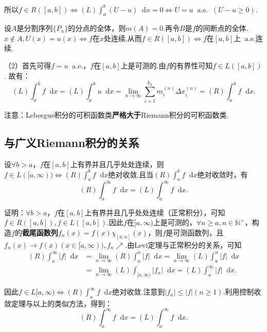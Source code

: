 \documentclass[bwprint, withoutpreface]{cumcmthesis}
\newcommand*{\dif}{\mathop{}\!\mathrm{d}}
\begin{document}
所以$f \in R([a, b]) \Leftrightarrow (L) \int_{a}^{b} (U - u) \dif x = 0 \Leftrightarrow U = u \mathop{} \! \mathrm{a.e.} \! \mathop{} (U - u \geqslant 0)$.

设$A$是分割序列$\{P_n\}$的分点的全体，则$m(A) = 0$.再令$B$是$f$的间断点的全体.$x \notin A, U(x) = u(x) \Leftrightarrow f \mbox{在} x$处连续.从而$f \in R([a, b]) \Leftrightarrow f \mbox{在} [a, b] \mbox{上} \mathop{} \! \mathrm{a.e.}$连续.

（2）首先可得$f = u \mathop{} \! \mathrm{a.e.}$，$f$在$[a, b]$上是可测的.由$f$的有界性可知$f \in L([a, b])$. 故有：
\begin{equation*}
	(L) \int_{a}^{b} f \dif x = (L) \int_{a}^{b} u \dif x = \lim_{n \to \infty}{\sum_{i = 1}^{k_n} m_i^{(n)} \Delta x_i^{(n)}} = (R) \int_{a}^{b} f \dif x.
\end{equation*}

注意：Lebesgue积分的可积函数类\textbf{严格大于}Riemann积分的可积函数类.

\subsection{与广义Riemann积分的关系}
设$\forall b > a$，$f$在$[a, b]$上有界并且几乎处处连续，则$f \in L([a, \infty)) \Leftrightarrow (R) \int_{a}^{b} f \dif x$绝对收敛.且当$(R) \int_{a}^{b} f \dif x$绝对收敛时，有
\begin{equation*}
	(R) \int_{a}^{\infty} f \dif x = (L) \int_{a}^{\infty} f \dif x.
\end{equation*}

证明：$\forall b > a$，$f$在$[a, b]$上有界并且几乎处处连续（正常积分），可知$f \in R([a, b]), f \in L([a, b])$.因此$f$在$[a, \infty)$上是可测的，$\forall n \geqslant a, n \in \mathbb{N}^+$，构造$f$的\textbf{截尾函数列}$f_n(x) = f(x) \chi_{[a, n]}(x)$，则$f$是可测函数列，且$f_n(x) \to f(x)(x \in [a, \infty)), f_n \nearrow$.由Levi定理与正常积分的关系，可知
\begin{align*}
	(R) \int_{a}^{\infty} |f| \dif x & = \lim_{n \to \infty}(R) \int_{a}^{n} |f| \dif x = \lim_{n \to \infty} (L) \int_{a}^{n} |f| \dif x \\
									 & = \lim_{n \to \infty}(L) \int_{[a, \infty)} |f_n| \dif x = (L) \int_{a}^{\infty} |f| \dif x.
\end{align*}

因此$f \in L[a, \infty) \Leftrightarrow (R) \int_{a}^{\infty} f \dif x$绝对收敛.注意到$|f_n| \leqslant |f|(n \geqslant 1)$.利用控制收敛定理与以上的类似方法，得到：
\begin{equation*}
	(R) \int_{a}^{\infty} f \dif x = (L) \int_{a}^{\infty} f \dif x.
\end{equation*}
\end{document}
